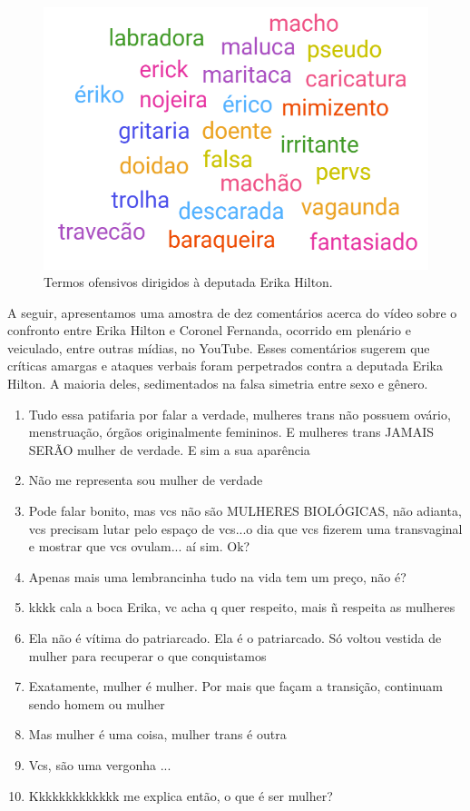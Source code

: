 \documentclass[portuguese]{textolivre}
\begin{document}
\begin{figure}[h!]
\centering
\begin{minipage}{.5\textwidth}
\includegraphics[width=\textwidth ]{Fig5.png}
\caption{Termos ofensivos dirigidos à deputada Erika Hilton.}
\label{fig-2}
\end{minipage}
\end{figure}

A seguir, apresentamos uma amostra de dez comentários acerca do vídeo sobre o confronto entre Erika Hilton e Coronel Fernanda, ocorrido em plenário e veiculado, entre outras mídias, no YouTube. Esses comentários sugerem que críticas amargas e ataques verbais foram perpetrados contra a deputada Erika Hilton. A maioria deles, sedimentados na falsa simetria entre sexo e gênero.

\medskip
\begin{enumerate}
\item Tudo essa patifaria por falar a verdade, mulheres trans não possuem ovário, menstruação, órgãos originalmente femininos. E mulheres trans JAMAIS SERÃO mulher de verdade. E sim a sua aparência
\item Não me representa sou mulher de verdade
\item Pode falar bonito, mas vcs não são MULHERES BIOLÓGICAS, não adianta, vcs precisam lutar pelo espaço de vcs...o dia que vcs fizerem uma transvaginal e mostrar que vcs ovulam... aí sim.  Ok?
\item Apenas mais uma lembrancinha tudo na vida tem um preço, não é?
\item kkkk cala a boca Erika, vc acha q quer respeito, mais ñ respeita as mulheres
\item Ela não é vítima do patriarcado. Ela é o patriarcado. Só voltou vestida de mulher para recuperar o que conquistamos
\item Exatamente, mulher é mulher. Por mais que façam a transição, continuam sendo homem ou mulher
\item Mas mulher é uma coisa, mulher trans é outra
\item Vcs, são uma vergonha ...
\item Kkkkkkkkkkkkk me explica então, o que é ser mulher?
\end{enumerate}
\medskip
\end{document}
